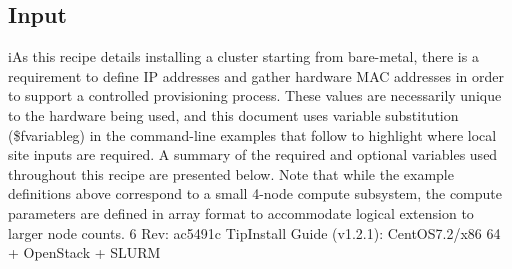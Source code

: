 \documentclass[12pt]{article}
\begin{document}
\subsection*{Input}
iAs this recipe details installing a cluster starting from bare-metal, there is a requirement to define IP addresses and gather hardware MAC addresses in order to support a controlled provisioning process. These
values are necessarily unique to the hardware being used, and this document uses variable substitution 
(\$fvariableg) in the command-line examples that follow to highlight where local site inputs are required.
A summary of the required and optional variables used throughout this recipe are presented below. Note
that while the example definitions above correspond to a small 4-node compute subsystem, the compute
parameters are defined in array format to accommodate logical extension to larger node counts.
6 Rev: ac5491c
\small{Tip}Install Guide (v1.2.1): CentOS7.2/x86 64 + OpenStack + SLURM
\end{document}
